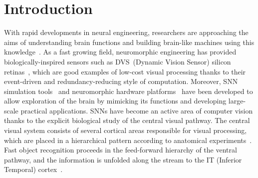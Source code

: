 \section{Introduction}
\label{sec:intro}
With rapid developments in neural engineering, researchers are approaching the aims of understanding brain functions and building brain-like machines using this knowledge~\citep{furber2007neural}.
As a fast growing field, neuromorphic engineering has provided biologically-inspired sensors such as DVS~(Dynamic Vision Sensor) silicon retinas~\citep{serrano-gotarredona_128_2013, lichtsteiner2008128}, which are good examples of low-cost visual processing thanks to their event-driven and redundancy-reducing style of computation.
Moreover, SNN simulation tools~\citep{davison2008pynn, gewaltig2007nest, goodman2008brian} and neuromorphic hardware platforms~\citep{furber2013overview,  schemmel2010wafer, moradi2014event} have been developed to allow exploration of the brain by mimicking its functions and developing large-scale practical applications.
SNNs have become an active area of computer vision thanks to the explicit  biological study of the central visual pathway.
The central visual system consists of several cortical areas responsible for visual processing, which are placed in a hierarchical pattern according to anatomical experiments~\citep{felleman1991distributed}.
Fast object recognition proceeds in  the feed-forward hierarchy of the ventral pathway, and the information is unfolded along the stream to the  IT (Inferior Temporal) cortex~\citep{dicarlo2012does}.


